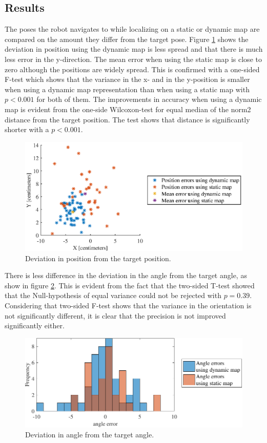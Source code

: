 \subsection{Results}
The poses the robot navigates to while localizing on a static or dynamic map are compared on the amount they differ from the target pose.
Figure \ref{fig:precision_test_positions} shows the deviation in position using the dynamic map is less spread and that there is much less error in the y-direction. The mean error when using the static map is close to zero although the positions are widely spread.
This is confirmed with a one-sided F-test which shows that the variance in the x- and in the y-position is smaller when using a dynamic map representation than when using a static map with $p<0.001$ for both of them.
The improvements in accuracy when using a dynamic map is evident from the one-side Wilcoxon-test for equal median of the norm2 distance from the target position. The test shows that distance is significantly shorter with a $p<0.001$.

\begin{figure}
    \centering
    \includegraphics[scale=1]{chapters/evaluation/figures/precision_test_positions}
    \caption{Deviation in position from the target position.}
    \label{fig:precision_test_positions}
\end{figure}

There is less difference in the deviation in the angle from the target angle, as show in figure \ref{fig:precision_test_angles}. This is evident from the fact that the two-sided T-test showed that the Null-hypothesis of equal variance could not be rejected with $p=0.39$.
Considering that two-sided F-test shows that the variance in the orientation is not significantly different, it is clear that the precision is not improved significantly either.

\begin{figure}
    \centering
    \includegraphics[scale=1]{chapters/evaluation/figures/precision_test_angles}
    \caption{Deviation in angle from the target angle.}
    \label{fig:precision_test_angles}
\end{figure}